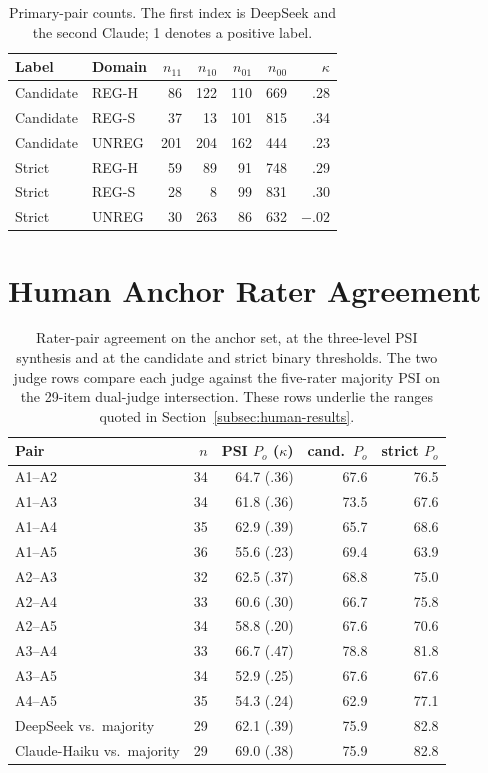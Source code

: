 \documentclass[11pt]{article}
\begin{document}
\begin{table}[H]
\centering
\scriptsize
\setlength{\tabcolsep}{3pt}
\begin{tabular}{@{}llrrrrr@{}}
\toprule
Label & Domain & $n_{11}$ & $n_{10}$ & $n_{01}$ & $n_{00}$ & $\kappa$ \\
\midrule
Candidate & REG-H & 86 & 122 & 110 & 669 & .28 \\
Candidate & REG-S & 37 & 13 & 101 & 815 & .34 \\
Candidate & UNREG & 201 & 204 & 162 & 444 & .23 \\
Strict & REG-H & 59 & 89 & 91 & 748 & .29 \\
Strict & REG-S & 28 & 8 & 99 & 831 & .30 \\
Strict & UNREG & 30 & 263 & 86 & 632 & $-.02$ \\
\bottomrule
\end{tabular}
\caption{Primary-pair counts. The first index is DeepSeek and the second Claude; 1 denotes a positive label.}
\end{table}

\section{Human Anchor Rater Agreement}
\label{app:human}

\begin{table}[H]
\centering
\scriptsize
\setlength{\tabcolsep}{3.5pt}
\begin{tabular}{@{}lrrrr@{}}
\toprule
Pair & $n$ & PSI $P_o$ ($\kappa$) & cand.\ $P_o$ & strict $P_o$ \\
\midrule
A1--A2 & 34 & 64.7 (.36) & 67.6 & 76.5 \\
A1--A3 & 34 & 61.8 (.36) & 73.5 & 67.6 \\
A1--A4 & 35 & 62.9 (.39) & 65.7 & 68.6 \\
A1--A5 & 36 & 55.6 (.23) & 69.4 & 63.9 \\
A2--A3 & 32 & 62.5 (.37) & 68.8 & 75.0 \\
A2--A4 & 33 & 60.6 (.30) & 66.7 & 75.8 \\
A2--A5 & 34 & 58.8 (.20) & 67.6 & 70.6 \\
A3--A4 & 33 & 66.7 (.47) & 78.8 & 81.8 \\
A3--A5 & 34 & 52.9 (.25) & 67.6 & 67.6 \\
A4--A5 & 35 & 54.3 (.24) & 62.9 & 77.1 \\
\midrule
DeepSeek vs.\ majority & 29 & 62.1 (.39) & 75.9 & 82.8 \\
Claude-Haiku vs.\ majority & 29 & 69.0 (.38) & 75.9 & 82.8 \\
\bottomrule
\end{tabular}
\caption{Rater-pair agreement on the anchor set, at the three-level PSI synthesis and at the candidate and strict binary thresholds. The two judge rows compare each judge against the five-rater majority PSI on the 29-item dual-judge intersection. These rows underlie the ranges quoted in Section~\ref{subsec:human-results}.}
\end{table}
\end{document}
